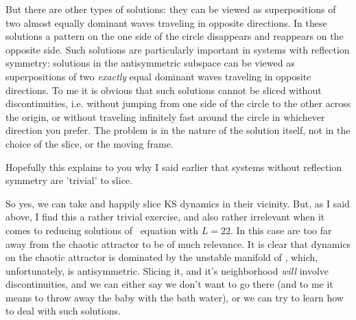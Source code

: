 \begin{description}
    But there are other types of solutions: they can be viewed as superpositions of two almost equally dominant waves traveling in opposite directions.  In these solutions a pattern on the one side of the circle disappears and reappears on the opposite side.  Such solutions are particularly important in systems with reflection symmetry: solutions in the antisymmetric subspace can be viewed as superpositions of two {\em exactly} equal dominant waves traveling in opposite directions.  To me it is obvious that such solutions cannot be sliced without discontinuities, i.e. without jumping from one side of the circle to the other across the origin, or without traveling infinitely fast around the circle in whichever direction you prefer.  The problem is in the nature of the solution itself, not in the choice of the slice, or the moving frame.
    
    Hopefully this explains to you why I said earlier that systems without reflection symmetry are 'trivial' to slice.
    
    So yes, we can take  and happily slice KS dynamics in their vicinity.  But, as I said above, I find this a rather trivial exercise, and also rather irrelevant when it comes to reducing solutions of \KS\ equation with $L = 22$.  In this case  are too far away from the chaotic attractor to be of much relevance.  It is clear that dynamics on the chaotic attractor is dominated by the unstable manifold of , which, unfortunately, is antisymmetric.  Slicing it, and it's neighborhood {\em will} involve discontinuities, and we can either say we don't want to go there (and to me it means to throw away the baby with the bath water), or we can try to learn how to deal with such solutions.
    

\end{description}

\renewcommand{\ssp}{a}
